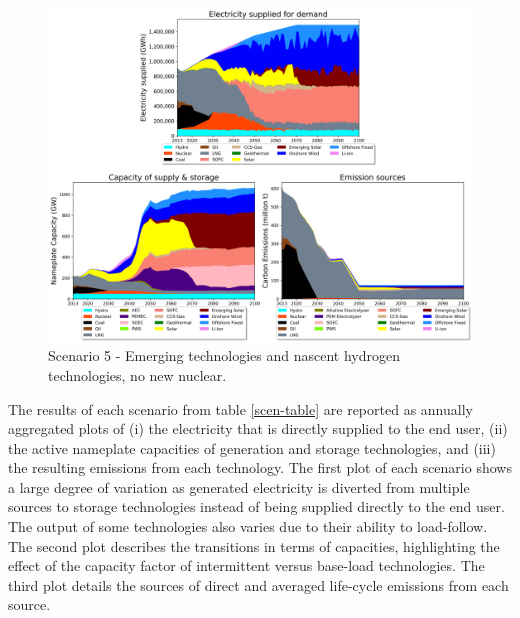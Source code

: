 \begin{figure}[H] 
\centering
\includegraphics[scale=0.5]{figures/lowtrltech_nonuc}
\caption{Scenario 5 - Emerging technologies and nascent hydrogen technologies, no new nuclear.}
\label{scen5}
\end{figure}

The results of each scenario from table \ref{scen-table} are reported as annually aggregated plots of (i) the electricity that is directly supplied to the end user, (ii) the active nameplate capacities of generation and storage technologies, and (iii) the resulting emissions from each technology. The first plot of each scenario shows a large degree of variation as generated electricity is diverted from multiple sources to storage technologies instead of being supplied directly to the end user. The output of some technologies also varies due to their ability to load-follow. The second plot describes the transitions in terms of capacities, highlighting the effect of the capacity factor of intermittent versus base-load technologies. The third plot details the sources of direct and averaged life-cycle emissions from each source.

